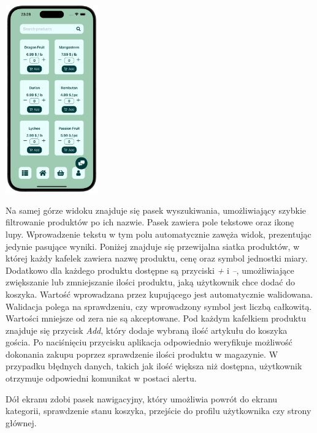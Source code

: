 \begin{center} 
    \includegraphics[width=0.3\textwidth]{images/front/products_page.png}  
\end{center}

Na samej górze widoku znajduje się pasek wyszukiwania, umożliwiający szybkie filtrowanie produktów po ich nazwie. Pasek zawiera pole tekstowe oraz ikonę lupy. Wprowadzenie tekstu w tym polu automatycznie zawęża widok, prezentując jedynie pasujące wyniki. Poniżej znajduje się przewijalna siatka produktów, w której każdy kafelek zawiera nazwę produktu, cenę oraz symbol jednostki miary. Dodatkowo dla każdego produktu dostępne są przyciski \textit{+} i \textit{–}, umożliwiające zwiększanie lub zmniejszanie ilości produktu, jaką użytkownik chce dodać do koszyka. Wartość wprowadzana przez kupującego jest automatycznie walidowana. Walidacja polega na sprawdzeniu, czy wprowadzony symbol jest liczbą całkowitą. Wartości mniejsze od zera nie są akceptowane. Pod każdym kafelkiem produktu znajduje się przycisk \textit{Add}, który dodaje wybraną ilość artykułu do koszyka gościa. Po naciśnięciu przycisku aplikacja odpowiednio weryfikuje możliwość dokonania zakupu poprzez sprawdzenie ilości produktu w magazynie. W przypadku błędnych danych, takich jak ilość większa niż dostępna, użytkownik otrzymuje odpowiedni komunikat w postaci alertu. 

Dół ekranu zdobi pasek nawigacyjny, który umożliwia powrót do ekranu kategorii, sprawdzenie stanu koszyka, przejście do profilu użytkownika czy strony głównej.

